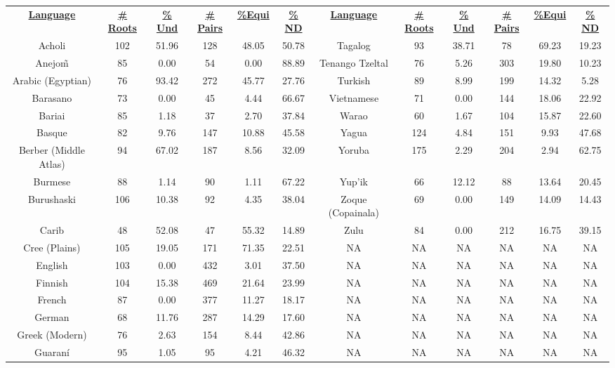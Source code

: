 \begin{tabular}{cccccccccccc}
\underline{\textbf{Language}} & \underline{\textbf{\# Roots}} & \underline{\textbf{\% Und}} & \underline{\textbf{\# Pairs}} & \underline{\textbf{\%Equi}} & \underline{\textbf{\% ND}} & \underline{\textbf{Language}} & \underline{\textbf{\# Roots}} & \underline{\textbf{\% Und}} & \underline{\textbf{\# Pairs}} & \underline{\textbf{\%Equi}} & \underline{\textbf{\% ND}} \\
Acholi & 102 & 51.96 & 128 & 48.05 & 50.78 & Tagalog & 93 & 38.71 & 78 & 69.23 & 19.23 \\
Anejo\~{m} & 85 & 0.00 & 54 & 0.00 & 88.89 & Tenango Tzeltal & 76 & 5.26 & 303 & 19.80 & 10.23 \\
Arabic (Egyptian) & 76 & 93.42 & 272 & 45.77 & 27.76 & Turkish & 89 & 8.99 & 199 & 14.32 & 5.28 \\
Barasano & 73 & 0.00 & 45 & 4.44 & 66.67 & Vietnamese & 71 & 0.00 & 144 & 18.06 & 22.92 \\
Bariai & 85 & 1.18 & 37 & 2.70 & 37.84 & Warao & 60 & 1.67 & 104 & 15.87 & 22.60 \\
Basque & 82 & 9.76 & 147 & 10.88 & 45.58 & Yagua & 124 & 4.84 & 151 & 9.93 & 47.68 \\
Berber (Middle Atlas) & 94 & 67.02 & 187 & 8.56 & 32.09 & Yoruba & 175 & 2.29 & 204 & 2.94 & 62.75 \\
Burmese & 88 & 1.14 & 90 & 1.11 & 67.22 & Yup'ik & 66 & 12.12 & 88 & 13.64 & 20.45 \\
Burushaski & 106 & 10.38 & 92 & 4.35 & 38.04 & Zoque (Copainala) & 69 & 0.00 & 149 & 14.09 & 14.43 \\
Carib & 48 & 52.08 & 47 & 55.32 & 14.89 & Zulu & 84 & 0.00 & 212 & 16.75 & 39.15 \\
Cree (Plains) & 105 & 19.05 & 171 & 71.35 & 22.51 & NA & NA & NA & NA & NA & NA \\
English & 103 & 0.00 & 432 & 3.01 & 37.50 & NA & NA & NA & NA & NA & NA \\
Finnish & 104 & 15.38 & 469 & 21.64 & 23.99 & NA & NA & NA & NA & NA & NA \\
French & 87 & 0.00 & 377 & 11.27 & 18.17 & NA & NA & NA & NA & NA & NA \\
German & 68 & 11.76 & 287 & 14.29 & 17.60 & NA & NA & NA & NA & NA & NA \\
Greek (Modern) & 76 & 2.63 & 154 & 8.44 & 42.86 & NA & NA & NA & NA & NA & NA \\
Guaraní & 95 & 1.05 & 95 & 4.21 & 46.32 & NA & NA & NA & NA & NA & NA \\

\end{tabular}
